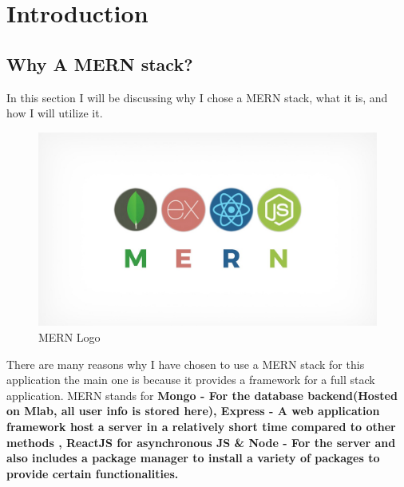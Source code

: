\chapter{Introduction}
\section {Why A MERN stack?}
In this section I will be discussing why I chose a MERN stack, what it is, and how I will utilize it.
\begin{center}
  \begin{figure}[h!]
    \includegraphics[width=\textwidth]{img/mern.jpeg}
    \caption{MERN Logo}
    \label{fig: Image of MERN stack logo}
  \end{figure}
\end{center}
There are many reasons why I have chosen to use a MERN stack for this
application the main one is because it provides a framework for a full stack
application.
MERN stands for \textbf{Mongo - For the database backend(Hosted on Mlab, all user info is stored here),
Express - A web application framework
host a server in a relatively short time compared to other methods
, ReactJS for asynchronous JS \& Node - For the server and also includes a package manager to install a variety of packages to provide certain functionalities.}
\cite{MERN}
\\

